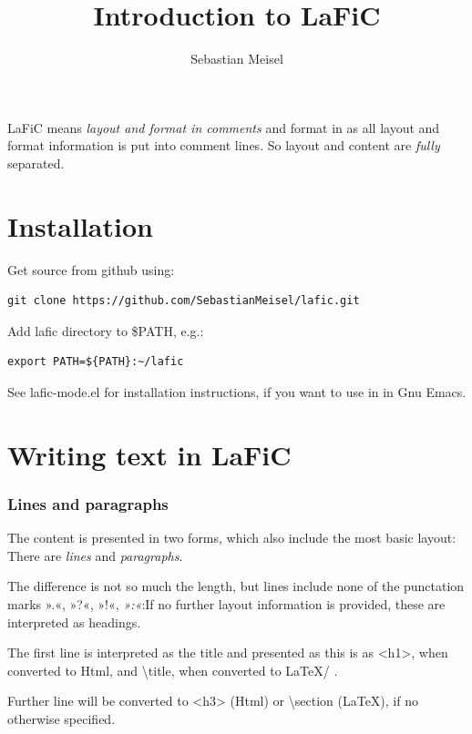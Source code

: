 \documentclass{article}
\title{Introduction to LaFiC}
\author{Sebastian Meisel}
\begin{document}
\maketitle


LaFiC means \textit{layout and format in comments} and format in as all layout and
format information is put into comment lines. So layout and
content are \emph{fully} separated.

\part{Installation}

Get source from github using:

\begin{verbatim}
git clone https://github.com/SebastianMeisel/lafic.git

\end{verbatim}

Add lafic directory to \$PATH, e.g.:

\begin{verbatim}
export PATH=${PATH}:~/lafic

\end{verbatim}

See lafic-mode.el for installation instructions, if you want
to use in in Gnu Emacs.

\part{Writing text in LaFiC}

\section{Lines and paragraphs}

The content is presented in two forms, which also include
the most basic layout: There are \emph{lines} and \emph{paragraphs}.

The difference is not so much the length, but lines include
none of the punctation marks ».«, »?«, »!«, \emph{»:«}:If no
further layout information is provided, these are
interpreted as headings.

The first line is interpreted as the title and presented as
this is as <h1>, when converted to Html, and \textbackslash title, when 
converted to \LaTeX / \XeTeX.

Further line will be converted to <h3> (Html) or \textbackslash section
(\LaTeX), if no otherwise specified.
\end{document}
